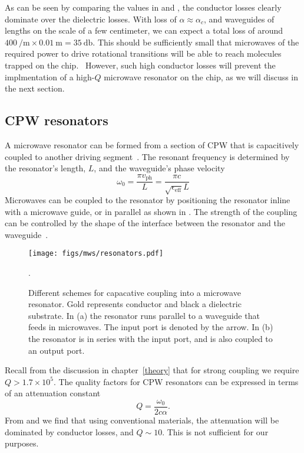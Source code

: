 As can be seen by comparing the values in  and
, the conductor losses clearly dominate over
the dielectric losses.
%
With loss of $\alpha \approx \alpha_c$, and waveguides of lengths on
the scale of a few centimeter, we can expect a total loss of around
$\SI{400}{\per\metre} \times \SI{0.01}{\metre} = \SI{35}{\decibel}$. This
should be sufficiently small that microwaves of the required power to drive
rotational transitions will be able to reach molecules
trapped on the chip.~\cite{Treutlein2008}
%
However, such high conductor losses will prevent the implmentation of a
high-$Q$ microwave resonator on the chip, as we will discuss in the next
section.

\subsection{CPW resonators}
\label{mws:resonators}

A microwave resonator can be formed from a section of CPW that is capacitively
coupled to another driving segment~\cite{Day2003}. The resonant frequency is
determined by the resonator's length, $L$, and the waveguide's phase
velocity~\cite{Simons2004}
%
\begin{equation}
  \omega_0 = \frac{\pi v_\text{ph}}{L} = \frac{\pi
  c}{\sqrt{\epsilon_\text{eff}} L}
\end{equation}
%
Microwaves can be coupled to the resonator by positioning the resonator inline
with a microwave guide, or in parallel as shown in
. The strength of the coupling can be controlled by the shape of the
interface between the resonator and the waveguide~\cite{doi:10.1063/1.3010859}.

\begin{figure}
  \centering
  \texttt{[image: figs/mws/resonators.pdf]}
  \caption{Different schemes for capacative coupling into a microwave
    resonator. Gold represents conductor and black a dielectric substrate. In
    (a) the resonator runs parallel to a waveguide that feeds in microwaves.
    The input port is denoted by the arrow. In (b) the resonator is in series
    with the input port, and is also coupled to an output port.
  }
  \label{mws:fig:resonators}.
\end{figure}

Recall from the discussion in chapter~\ref{theory} that for strong coupling we
require $Q > 1.7 \times 10^5$. The quality factors for CPW resonators can be
expressed in terms of an attenuation constant
%
\begin{equation}
  Q = \frac{\omega_0}{2c\alpha}.
  \label{mws:eqn:Qalpha}
\end{equation}
%
From  and  we
find that using conventional materials, the attenuation will be dominated
by conductor losses, and $Q\sim10$. This is not sufficient for our purposes.

